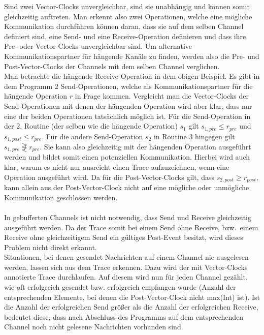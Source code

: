 Sind zwei Vector-Clocks 
unvergleichbar, sind sie unabhängig und können somit gleichzeitig auftreten. 
Man erkennt also zwei Operationen, welche eine mögliche Kommunikation durchführen 
können daran, dass sie auf dem selben Channel definiert sind, eine Send-
und eine Receive-Operation definieren und dass 
 ihre Pre- oder Vector-Clocks unvergleichbar sind.
Um alternative Kommunikationspartner für hängende Kanäle zu finden, werden also
die Pre- und Post-Vector-Clocks der Channels mit dem selben Channel verglichen.\\
Man betrachte die hängende Receive-Operation in dem obigen Beispiel. Es gibt 
in dem Programm 2 Send-Operationen, welche als Kommunikationspartner für 
die hängende Operation $r$ in Frage kommen. Vergleicht man die Vector-Clocks der 
Send-Operationen mit denen der hängenden Operation wird aber klar, dass nur 
eine der beiden Operationen tatsächlich möglich ist. Für die Send-Operation 
in der 2. Routine (der selben wie die hängende Operation) $s_1$ gilt 
$s_{1, pre} \leq r_{pre}$ und $s_{1, post} \leq r_{pre}$.  
Für die andere Send-Operation $s_2$ in Routine 3 hingegen gilt 
$s_{1, pre} \not\gtreqless r_{pre}$. Sie kann also gleichzeitig mit der 
hängenden Operation ausgeführt werden und bildet somit einen potenziellen 
Kommunikation. Hierbei wird auch klar, warum es nicht nur ausreicht einen 
Trace aufzuzeichnen, wenn eine Operation ausgeführt wird. Da für die 
Post-Vector-Clocks gilt, dass $s_{2, post} \geq r_{post}$, kann allein aus der 
Post-Vector-Clock nicht auf eine mögliche oder unmögliche Kommunikation geschlossen werden.\\\\
In gebufferten Channels ist nicht notwendig, dass Send und Receive gleichzeitig
ausgeführt werden.
Da der Trace somit bei einem Send ohne Receive, bzw.~einem Receive ohne gleichzeitigem
Send ein gültiges Post-Event besitzt, 
wird dieses Problem nicht direkt erkannt.\\
Situationen, bei denen gesendet Nachrichten auf einem Channel 
nie ausgelesen werden, lassen sich aus dem Trace erkennen.
Dazu wird der mit Vector-Clocks annotierte Trace durchlaufen. Auf diesem 
wird nun für jeden Channel gezählt, wie oft erfolgreich gesendet bzw. erfolgreich empfangen 
wurde (Anzahl der entsprechenden Elemente, bei denen die Post-Vector-Clock 
nicht max(Int) ist). Ist die Anzahl der erfolgreichen Send größer als 
die Anzahl der erfolgreichen Receive, bedeutet diese, dass nach Abschluss des 
Programms auf dem entsprechenden Channel noch nicht gelesene Nachrichten vorhanden sind.\\
